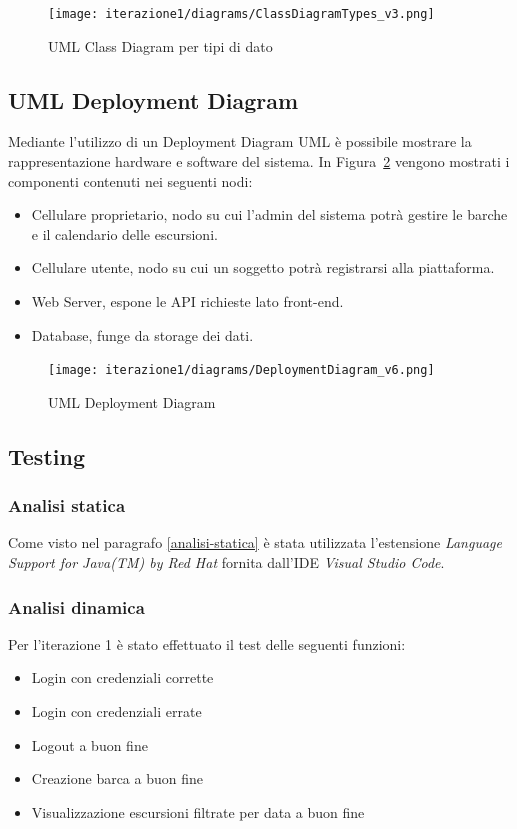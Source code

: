 \begin{figure}[htbp]
    \texttt{[image: iterazione1/diagrams/ClassDiagramTypes\_v3.png]}
    \centering
    \caption{UML Class Diagram per tipi di dato}
    \label{fig:ClassDiagramTypes}
\end{figure}

\clearpage
\subsection{UML Deployment Diagram}
Mediante l'utilizzo di un Deployment Diagram UML è possibile mostrare la rappresentazione hardware e software del sistema. In Figura~\ref{fig:DeploymentDiagram} vengono mostrati i componenti contenuti nei seguenti nodi:

\begin{itemize}
    \item Cellulare proprietario, nodo su cui l'admin del sistema potrà gestire le barche e il calendario delle escursioni.
    \item Cellulare utente, nodo su cui un soggetto potrà registrarsi alla piattaforma.
    \item Web Server, espone le API richieste lato front-end.
    \item Database, funge da storage dei dati.
\end{itemize}

\begin{figure}[htbp]
    \texttt{[image: iterazione1/diagrams/DeploymentDiagram\_v6.png]}
    \centering
    \caption{UML Deployment Diagram}
    \label{fig:DeploymentDiagram}
\end{figure}

\clearpage

\subsection{Testing}

\subsubsection{Analisi statica}
Come visto nel paragrafo \ref{analisi-statica} è stata utilizzata l'estensione \textit{Language Support for Java(TM) by Red Hat} fornita
dall'IDE \textit{Visual Studio Code}.

\subsubsection{Analisi dinamica}
Per l'iterazione 1 è stato effettuato il test delle seguenti funzioni:
\begin{itemize}
  \item Login con credenziali corrette
  \item Login con credenziali errate
  \item Logout a buon fine
  \item Creazione barca a buon fine
  \item Visualizzazione escursioni filtrate per data a buon fine
\end{itemize}

